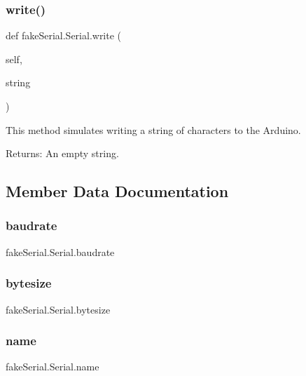 \subsubsection{\texorpdfstring{write()}{write()}}
{\footnotesize\ttfamily def fake\+Serial.\+Serial.\+write (\begin{DoxyParamCaption}\item[{}]{self,  }\item[{}]{string }\end{DoxyParamCaption})}

\begin{DoxyVerb}This method simulates writing a string of characters to the Arduino.

Returns:
    An empty string.
\end{DoxyVerb}
 

\subsection{Member Data Documentation}
\mbox{\label{classfake_serial_1_1_serial_afe5ee18e12722951265fdd9d4fa81a51}} 
\subsubsection{\texorpdfstring{baudrate}{baudrate}}
{\footnotesize\ttfamily fake\+Serial.\+Serial.\+baudrate}

\mbox{\label{classfake_serial_1_1_serial_afc2c7273bcb952833c250bda88ba2d08}} 
\subsubsection{\texorpdfstring{bytesize}{bytesize}}
{\footnotesize\ttfamily fake\+Serial.\+Serial.\+bytesize}

\mbox{\label{classfake_serial_1_1_serial_af3d8449c9f1992bbe479981375083651}} 
\subsubsection{\texorpdfstring{name}{name}}
{\footnotesize\ttfamily fake\+Serial.\+Serial.\+name}

